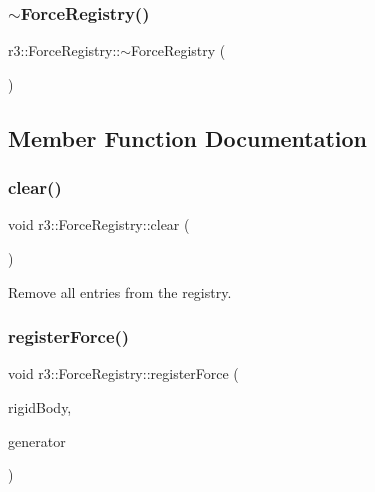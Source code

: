 \subsubsection{\texorpdfstring{$\sim$\+Force\+Registry()}{~ForceRegistry()}}
{\footnotesize\ttfamily r3\+::\+Force\+Registry\+::$\sim$\+Force\+Registry (\begin{DoxyParamCaption}{ }\end{DoxyParamCaption})\hspace{0.3cm}{\ttfamily [default]}}



\subsection{Member Function Documentation}
\mbox{\label{classr3_1_1_force_registry_ab1c31bc403d998af16df97ff5d42c95f}} 
\subsubsection{\texorpdfstring{clear()}{clear()}}
{\footnotesize\ttfamily void r3\+::\+Force\+Registry\+::clear (\begin{DoxyParamCaption}{ }\end{DoxyParamCaption})}



Remove all entries from the registry. 

\mbox{\label{classr3_1_1_force_registry_a18e3bee47d4510cc91426103042b382c}} 
\subsubsection{\texorpdfstring{register\+Force()}{registerForce()}}
{\footnotesize\ttfamily void r3\+::\+Force\+Registry\+::register\+Force (\begin{DoxyParamCaption}\item[{\mbox{\hyperlink{classr3_1_1_rigid_body}{Rigid\+Body}} $\ast$}]{rigid\+Body,  }\item[{\mbox{\hyperlink{classr3_1_1_force_generator}{Force\+Generator}} $\ast$}]{generator }\end{DoxyParamCaption})}




